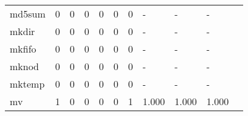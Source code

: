 \begin{longtable}{lp{1.20cm}p{1.20cm}p{1.20cm}p{1.20cm}p{1.20cm}p{1.20cm}p{1.20cm}p{1.20cm}p{1.20cm}p{1.20cm}}
md5sum    &                                     0 &                                                  0 &                                                  0 &                                                  0 &                                                  0 &                                                  0 &                                             - &                                                  - &                                                  - \\
mkdir     &                                     0 &                                                  0 &                                                  0 &                                                  0 &                                                  0 &                                                  0 &                                             - &                                                  - &                                                  - \\
mkfifo    &                                     0 &                                                  0 &                                                  0 &                                                  0 &                                                  0 &                                                  0 &                                             - &                                                  - &                                                  - \\
mknod     &                                     0 &                                                  0 &                                                  0 &                                                  0 &                                                  0 &                                                  0 &                                             - &                                                  - &                                                  - \\
mktemp    &                                     0 &                                                  0 &                                                  0 &                                                  0 &                                                  0 &                                                  0 &                                             - &                                                  - &                                                  - \\
mv        &                                     1 &                                                  0 &                                                  0 &                                                  0 &                                                  0 &                                                  1 &                                         1.000 &                                              1.000 &                                              1.000 \\

\end{longtable}
